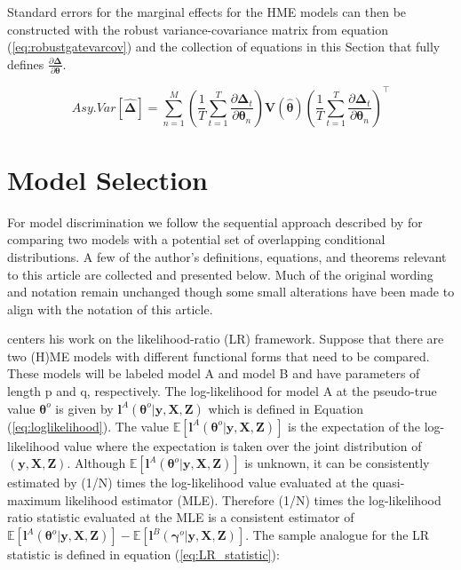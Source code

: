 \documentclass[12pt]{article}
\theoremstyle{definition}
\begin{document}
Standard errors for the marginal effects for the HME models can then be constructed with the robust variance-covariance matrix from equation (\ref{eq:robustgatevarcov}) and the collection of equations in this Section that fully defines $\frac{\partial \boldsymbol{\Delta}}{\partial \boldsymbol{\theta}}$.


\begin{equation} \label{eq:std_errs_full_marginal_effects}
  Asy.Var \left[ \boldsymbol{ \hat{ \Delta } } \right] = \sum^{M}_{n=1}  \left( \frac{1}{T} \sum^{T}_{t=1} \frac{\partial \boldsymbol{\Delta}_{t}}{\partial \boldsymbol{\theta}_{n}} \right)     \boldsymbol{V}(\boldsymbol{\hat{\theta}})      \left( \frac{1}{T} \sum^{T}_{t=1} \frac{\partial \boldsymbol{\Delta}_{t}}{\partial \boldsymbol{\theta}_{n}} \right)^\top
\end{equation} 


\section{Model Selection} \label{sec:ModelSelection}

For model discrimination we follow the sequential approach described by \citet{Voung1989} for comparing two models with a potential set of overlapping conditional distributions. A few of the author's definitions, equations, and theorems relevant to this article are collected and presented below. Much of the original wording and notation remain unchanged though some small alterations have been made to align with the notation of this article. 

\bigskip

\citet{Voung1989} centers his work on the likelihood-ratio (LR) framework. Suppose that there are two (H)ME models with different functional forms that need to be compared. These models will be labeled model A and model B and have parameters of length p and q, respectively. The log-likelihood for model A at the pseudo-true value $\boldsymbol{\theta}^{o}$ is given by $\boldsymbol{l}^{A}(\boldsymbol{\theta}^{o}| \boldsymbol{y}, \boldsymbol{X}, \boldsymbol{Z})$ which is defined in Equation (\ref{eq:loglikelihood}). The value $\mathbb{E} \left[ \boldsymbol{l}^{A}(\boldsymbol{\theta}^{o}| \boldsymbol{y}, \boldsymbol{X}, \boldsymbol{Z}) \right]$ is the expectation of the log-likelihood value where the expectation is taken over the joint distribution of $(\boldsymbol{y}, \boldsymbol{X}, \boldsymbol{Z})$. Although $\mathbb{E} \left[ \boldsymbol{l}^{A}(\boldsymbol{\theta}^{o}| \boldsymbol{y}, \boldsymbol{X}, \boldsymbol{Z}) \right]$ is unknown, it can be consistently estimated by (1/N) times the log-likelihood value evaluated at the quasi-maximum likelihood estimator (MLE). Therefore (1/N) times the log-likelihood ratio statistic evaluated at the MLE is a consistent estimator of $\mathbb{E} \left[ \boldsymbol{l}^{A}(\boldsymbol{\theta}^{o}| \boldsymbol{y}, \boldsymbol{X}, \boldsymbol{Z}) \right] - \mathbb{E} \left[ \boldsymbol{l}^{B}(\boldsymbol{\gamma}^{o}| \boldsymbol{y}, \boldsymbol{X}, \boldsymbol{Z}) \right]$. The sample analogue for the LR statistic is defined in equation (\ref{eq:LR_statistic}):
\end{document}
